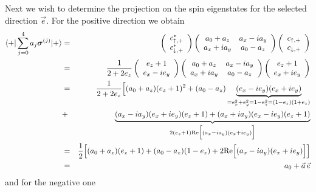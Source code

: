 \documentclass[11pt,a4paper]{report}
\begin{document}
Next we wish to determine the projection on the spin eigenstates for
the selected direction $\vec{e}$. For the positive direction we obtain
\begin{eqnarray}
\langle +|\sum_{j=0}^4 a_j\bm{\sigma}^{(j)}|+\rangle
&=&
\left(\begin{array}{c}
c_{\uparrow,+}^*\\c_{\downarrow,+}^*
\end{array}\right)
\left(\begin{array}{cc}
a_0+a_z&a_x-ia_y\\
a_x+ia_y & a_0-a_z
\end{array}\right)
\left(\begin{array}{c}
c_{\uparrow,+}\\c_{\downarrow,+}
\end{array}\right)
\nonumber\\
&=&
\frac{1}{2+2e_z}
\left(\begin{array}{c}
e_z+1\\e_x-ie_y
\end{array}\right)
\left(\begin{array}{cc}
a_0+a_z&a_x-ia_y\\
a_x+ia_y & a_0-a_z
\end{array}\right)
\left(\begin{array}{c}
e_z+1\\e_x+ie_y
\end{array}\right)
\nonumber\\
&=&\frac{1}{2+2e_z}
\Bigl[(a_0+a_z)(e_z+1)^2
+(a_0-a_z)
\underbrace{(e_x-ie_y)(e_x+ie_y)}_{=e_x^2+e_y^2=1-e_z^2=(1-e_z)(1+e_z)}
\nonumber\\
&+&
\underbrace{(a_x-ia_y)(e_x+ie_y)(e_z+1)
+(a_x+ia_y)(e_x-ie_y)(e_z+1)}_{2(e_z+1)\mathrm{Re}\Bigl[(a_x-ia_y)(e_x+ie_y)\Bigr]}
\nonumber\\
&=&\frac{1}{2}
\Bigl[(a_0+a_z)(e_z+1)+(a_0-a_z)(1-e_z)
+2\mathrm{Re}\Bigl[(a_x-ia_y)(e_x+ie_y)\Bigr]
\Bigr]
\nonumber\\
&=&a_0+\vec{a}\,\vec{e}
\end{eqnarray}
and for the negative one
\end{document}
